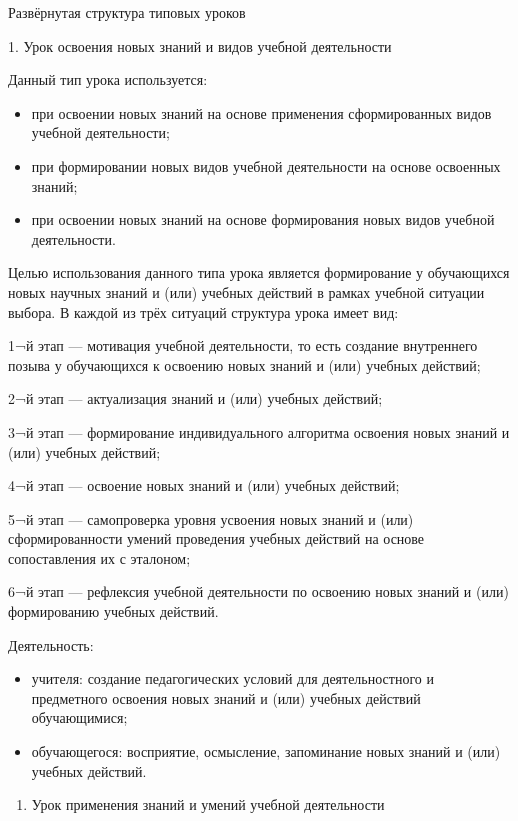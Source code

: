 \documentclass[
  11pt,
]{book}
\providecommand{\tightlist}{%
  \setlength{\itemsep}{0pt}\setlength{\parskip}{0pt}}
\begin{document}
Развёрнутая структура типовых уроков

1. Урок освоения новых знаний и видов учебной деятельности

Данный тип урока используется:

\begin{itemize}
\item
  при освоении новых знаний на основе применения сформированных видов учебной деятельности;
\item
  при формировании новых видов учебной деятельности на основе освоенных знаний;
\item
  при освоении новых знаний на основе формирования новых видов учебной деятельности.
\end{itemize}

Целью использования данного типа урока является формирование у обучающихся новых научных знаний и (или) учебных действий в рамках учебной ситуации выбора. В каждой из трёх ситуаций структура урока имеет вид:

1¬й этап --- мотивация учебной деятельности, то есть создание внутреннего позыва у обучающихся к освоению новых знаний и (или) учебных действий;

2¬й этап --- актуализация знаний и (или) учебных действий;

3¬й этап --- формирование индивидуального алгоритма освоения новых знаний и (или) учебных действий;

4¬й этап --- освоение новых знаний и (или) учебных действий;

5¬й этап --- самопроверка уровня усвоения новых знаний и (или) сформированности умений проведения учебных действий на основе сопоставления их с эталоном;

6¬й этап --- рефлексия учебной деятельности по освоению новых знаний и (или) формированию учебных действий.

Деятельность:

\begin{itemize}
\item
  учителя: создание педагогических условий для деятельностного и предметного освоения новых знаний и (или) учебных действий обучающимися;
\item
  обучающегося: восприятие, осмысление, запоминание новых знаний и (или) учебных действий.
\end{itemize}

\begin{enumerate}
\def\labelenumi{\arabic{enumi}.}
\setcounter{enumi}{1}
\tightlist
\item
  Урок применения знаний и умений учебной деятельности
\end{enumerate}
\end{document}
